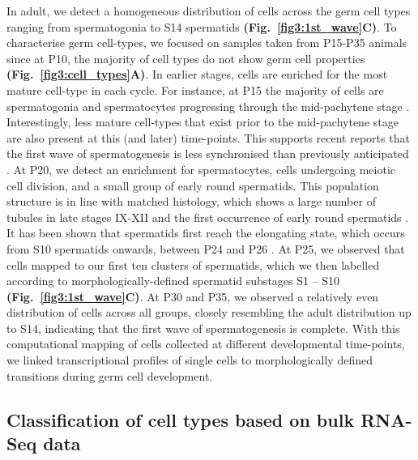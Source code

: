 In adult, we detect a homogeneous distribution of cells across the germ cell types ranging from spermatogonia to S14 spermatids \textbf{(Fig.~\ref{fig3:1st_wave}C)}. To characterise germ cell-types, we focused on samples taken from P15-P35 animals since at P10, the majority of cell types do not show germ cell properties \textbf{(Fig.~\ref{fig3:cell_types}A)}. In earlier stages, cells are enriched for the most mature cell-type in each cycle. For instance, at P15 the majority of cells are spermatogonia and spermatocytes progressing through the mid-pachytene stage \citep{Turner2004}. Interestingly, less mature cell-types that exist prior to the mid-pachytene stage are also present at this (and later) time-points. This supports recent reports that the first wave of spermatogenesis is less synchronised than previously anticipated \citep{Snyder2010}. At P20, we detect an enrichment for spermatocytes, cells undergoing meiotic cell division, and a small group of early round spermatids. This population structure is in line with matched histology, which shows a large number of tubules in late stages IX-XII and the first occurrence of early round spermatids \citep{Bellve1977}. It has been shown that spermatids first reach the elongating state, which occurs from S10 spermatids onwards, between P24 and P26 \citep{Janca1986}. At P25, we observed that cells mapped to our first ten clusters of spermatids, which we then labelled according to morphologically-defined spermatid substages S1 – S10 \textbf{(Fig.~\ref{fig3:1st_wave}C)}. At P30 and P35, we observed a relatively even distribution of cells across all groups, closely resembling the adult distribution up to S14, indicating that the first wave of spermatogenesis is complete. With this computational mapping of cells collected at different developmental time-points, we linked transcriptional profiles of single cells to morphologically defined transitions during germ cell development.

\newpage

\subsection{Classification of cell types based on bulk RNA-Seq data}


